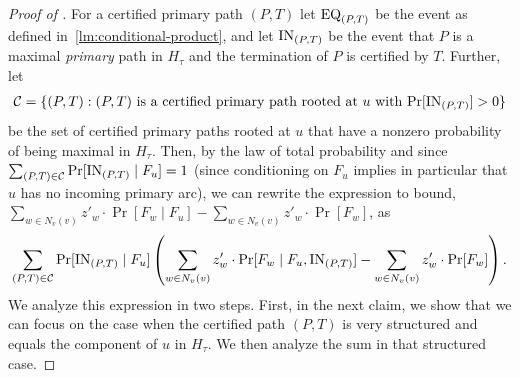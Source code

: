\begin{proof}[Proof of ] For a certified primary path $(P,T)$ let $\mathrm{EQ}_{(P,T)}$ be the event as defined in~\cref{lm:conditional-product}, and let $\mathrm{IN}_{(P,T)}$ be the event that $P$ is a maximal \emph{primary} path in $H_\tau$ and the termination of $P$ is certified by $T$. Further, let 
	\begin{align*}
	\mathcal{C} = \{(P,T) : \mbox{$(P,T)$ is a certified primary path rooted at $u$ with $\Pr[ \mathrm{IN}_{(P,T)} ] > 0$}\}
	\end{align*}
	be the set of certified primary paths rooted at $u$  that have a nonzero probability of being maximal in $H_\tau$.  Then, by the law of total probability and since $\sum_{(P,T)\in \mathcal{C}} \Pr[\mathrm{IN}_{(P,T)} \mid F_u] = 1$ 
	(since conditioning on $F_u$ implies in particular that $u$ has no incoming primary arc),
	we can rewrite the expression to bound, $\sum_{w\in N_v(v)} z'_w \cdot \Pr[F_w \mid F_u] - \sum_{w\in N_v(v)} z'_w \cdot \Pr[F_w]$, as
	\begin{align}
	\label{eq:large_variance_expression}
	\sum_{(P,T)\in \mathcal{C}}\Pr[\mathrm{IN}_{(P,T)} \mid F_u] \left(\sum_{w\in N_v(v)} z'_w \cdot \Pr[F_w \mid F_u, \mathrm{IN}_{(P,T)}] - \sum_{w\in N_v(v)} z'_w \cdot \Pr[F_w] \right).
	\end{align}
	We analyze this expression in two steps. First, in the next claim, we show that we can focus on the case when the certified path $(P,T)$ is very structured and equals the component of $u$ in $H_\tau$. We then analyze the sum in that structured case.
	

\end{proof}

